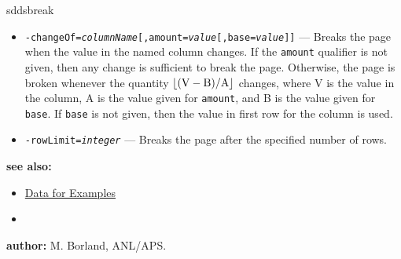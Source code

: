 \begin{sddsprog}{sddsbreak}
\begin{itemize}
      \item {\tt -changeOf=\emph{columnName}[,amount=\emph{value}[,base=\emph{value}]]} --- Breaks the page when the value in the named column changes. If the {\tt amount} qualifier is not given, then any change is sufficient to break the page. Otherwise, the page is broken whenever the quantity ${\rm \lfloor (V - B)/A \rfloor}$ changes, where V is the value in the column, A is the value given for {\tt amount}, and B is the value given for {\tt base}. If {\tt base} is not given, then the value in first row for the column is used.
      \item {\tt -rowLimit=\emph{integer}} --- Breaks the page after the specified number of rows.
    \end{itemize}
  \item \textbf{see also:}
    \begin{itemize}
      \item \hyperref[exampleData]{Data for Examples}
      \item {}
    \end{itemize}
  \item \textbf{author:} M. Borland, ANL/APS.
\end{sddsprog}
